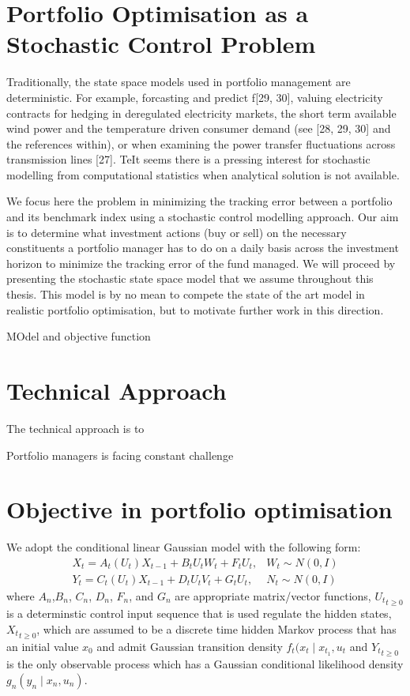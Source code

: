 \section{Portfolio Optimisation as a Stochastic Control Problem}
Traditionally, the state space models used in portfolio management are deterministic. For example, forcasting and predict f[29, 30], valuing electricity contracts for hedging in deregulated electricity markets, the short term available wind power and the temperature driven consumer demand (see [28, 29, 30] and the references within), or when examining the power transfer fluctuations across transmission lines [27]. TeIt seems there is a pressing interest for stochastic modelling from computational statistics when analytical solution is not available. 

We focus here the problem in minimizing the tracking error between a portfolio and its benchmark index using a stochastic control modelling approach. Our aim is to determine what investment actions (buy or sell) on the necessary constituents a portfolio manager has to do on a daily basis across the investment horizon to minimize the tracking error of the fund managed. We will proceed by presenting the stochastic state space model that we assume throughout this thesis. This model is by no mean to compete the state of the art model in realistic portfolio optimisation, but to motivate further work in this direction.

MOdel and objective function

\section{Technical Approach}
The technical approach is to 

Portfolio managers is facing constant challenge

\section{Objective in portfolio optimisation}
We adopt the conditional linear Gaussian model with the following form:
\begin{align}
  X_t = A_t(U_t)X_{t-1} + B_t{U_t}W_t + F_t{U_t}, & W_t \sim N(0,I) \\
  Y_t = C_t(U_t)X_{t-1} + D_t{U_t}V_t + G_t{U_t}, & N_t \sim N(0,I)
\label{eq:gaussianmodel}
\end{align}
where $A_n$,$B_n$, $C_n$, $D_n$, $F_n$, and $G_n$ are appropriate matrix/vector functions, ${U_t}_{t \geq 0}$ is a determinstic control input sequence that is used regulate the hidden states, ${X_t}_{t \geq 0}$, which are assumed to be a discrete time hidden Markov process that has an initial value $x_0$ and admit Gaussian transition density $f_t(x_t \mid x_{t_1}, u_t$ and ${Y_t}_{t \geq 0}$ is the only observable process which has a Gaussian conditional likelihood density $g_n(y_n \mid x_n, u_n)$.

